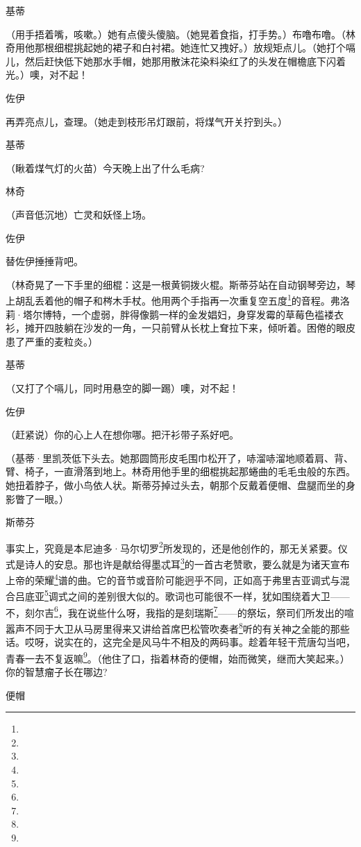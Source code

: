 \par 基蒂
\par （用手捂着嘴，咳嗽。）她有点傻头傻脑。（她晃着食指，打手势。）布噜布噜。（林奇用他那根细棍挑起她的裙子和白衬裙。她连忙又拽好。）放规矩点儿。（她打个嗝儿，然后赶快低下她那水手帽，她那用散沫花染料染红了的头发在帽檐底下闪着光。）噢，对不起！
\par 佐伊
\par 再弄亮点儿，查理。（她走到枝形吊灯跟前，将煤气开关拧到头。）
\par 基蒂
\par （瞅着煤气灯的火苗）今天晚上出了什么毛病?
\par 林奇
\par （声音低沉地）亡灵和妖怪上场。
\par 佐伊
\par 替佐伊捶捶背吧。
\par （林奇晃了一下手里的细棍：这是一根黄铜拨火棍。斯蒂芬站在自动钢琴旁边，琴上胡乱丢着他的帽子和梣木手杖。他用两个手指再一次重复空五度\footnote{}的音程。弗洛莉·塔尔博特，一个虚弱，胖得像鹅一样的金发娼妇，身穿发霉的草莓色褴褛衣衫，摊开四肢躺在沙发的一角，一只前臂从长枕上耷拉下来，倾听着。困倦的眼皮患了严重的麦粒炎。）
\par 基蒂
\par （又打了个嗝儿，同时用悬空的脚一踢）噢，对不起！
\par 佐伊
\par （赶紧说）你的心上人在想你哪。把汗衫带子系好吧。
\par （基蒂·里凯茨低下头去。她那圆筒形皮毛围巾松开了，哧溜哧溜地顺着肩、背、臂、椅子，一直滑落到地上。林奇用他手里的细棍挑起那蜷曲的毛毛虫般的东西。她扭着脖子，做小鸟依人状。斯蒂芬掉过头去，朝那个反戴着便帽、盘腿而坐的身影瞥了一眼。）
\par 斯蒂芬
\par 事实上，究竟是本尼迪多·马尔切罗\footnote{}所发现的，还是他创作的，那无关紧要。仪式是诗人的安息。那也许是献给得墨忒耳\footnote{}的一首古老赞歌，要么就是为诸天宣布上帝的荣耀\footnote{}谱的曲。它的音节或音阶可能迥乎不同，正如高于弗里吉亚调式与混合吕底亚\footnote{}调式之间的差别很大似的。歌词也可能很不一样，犹如围绕着大卫——不，刻尔吉\footnote{}，我在说些什么呀，我指的是刻瑞斯\footnote{}——的祭坛，祭司们所发出的喧嚣声不同于大卫从马房里得来又讲给首席巴松管吹奏者\footnote{}听的有关神之全能的那些话。哎呀，说实在的，这完全是风马牛不相及的两码事。趁着年轻干荒唐勾当吧，青春一去不复返嘛\footnote{}。（他住了口，指着林奇的便帽，始而微笑，继而大笑起来。）你的智慧瘤子长在哪边?
\par 便帽
